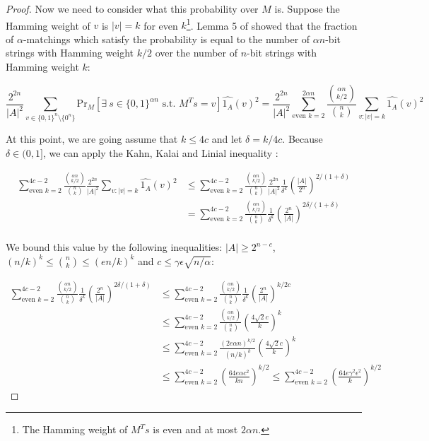 \documentclass[a4paper]{article}
\begin{document}
\begin{proof}
        Now we need to consider what this probability over $M$ is. Suppose the Hamming weight of $v$ is $|v| = k$ for even $k$\footnote{The Hamming weight of $M^Ts$ is even and at most $2\alpha n$.}. Lemma 5 of \cite{Gavinsky:2007:ESO:1250790.1250866} showed that the fraction of $\alpha$-matchings which satisfy the probability is equal to the number of $\alpha n$-bit strings with Hamming weight $k/2$ over the number of $n$-bit strings with Hamming weight $k$:

        $$\frac{2^{2n}}{|A|^2}\sum_{v \in \{0, 1\}^n\setminus\{0^n\}}\mathrm{Pr}_M[\exists~ s \in \{0, 1\}^{\alpha n} \textrm{ s.t. } M^Ts = v]\widehat{1_A}(v)^2 = \frac{2^{2n}}{|A|^2}\sum_{\textrm{even }k=2}^{2\alpha n}\frac{\binom{\alpha n}{k/2}}{\binom{n}{k}}\sum_{v:|v| = k}\widehat{1_A}(v)^2$$

        At this point, we are going assume that $k \leq 4c$ and let $\delta = k/4c$. Because $\delta \in (0,1]$, we can apply the Kahn, Kalai and Linial inequality \cite{21923}:

        \begin{align*}
            \sum_{\textrm{even }k=2}^{4c - 2}\frac{\binom{\alpha n}{k/2}}{\binom{n}{k}}\frac{2^{2n}}{|A|^2}\sum_{v:|v| = k}\widehat{1_A}(v)^2 &\leq \sum_{\textrm{even }k=2}^{4c-2}\frac{\binom{\alpha n}{k/2}}{\binom{n}{k}}\frac{2^{2n}}{|A|^2}\frac{1}{\delta^k}\left(\frac{|A|}{2^n}\right)^{2/(1 + \delta)}\\
            &= \sum_{\textrm{even }k=2}^{4c - 2}\frac{\binom{\alpha n}{k/2}}{\binom{n}{k}}\frac{1}{\delta^k}\left(\frac{2^n}{|A|}\right)^{2\delta/(1 + \delta)}\\
        \end{align*}

        We bound this value by the following inequalities: $|A| \geq 2^{n - c}$, $(n/k)^k \leq \binom{n}{k} \leq (en/k)^k$ and $c \leq \gamma \epsilon \sqrt{n/\alpha}$:

        \begin{align*}
            \sum_{\textrm{even }k=2}^{4c - 2}\frac{\binom{\alpha n}{k/2}}{\binom{n}{k}}\frac{1}{\delta^k}\left(\frac{2^n}{|A|}\right)^{2\delta/(1 + \delta)} &\leq \sum_{\textrm{even }k=2}^{4c - 2}\frac{\binom{\alpha n}{k/2}}{\binom{n}{k}}\frac{1}{\delta^k}\left(\frac{2^n}{|A|}\right)^{k/2c}\\
            &\leq \sum_{\textrm{even }k=2}^{4c - 2}\frac{\binom{\alpha n}{k/2}}{\binom{n}{k}}\left(\frac{4\sqrt{2}c}{k}\right)^{k}\\
            &\leq \sum_{\textrm{even }k=2}^{4c - 2}\frac{(2e\alpha n)^{k/2}}{(n/k)^k}\left(\frac{4\sqrt{2}c}{k}\right)^{k}\\
            &\leq \sum_{\textrm{even }k=2}^{4c - 2}\left(\frac{64e\alpha c^2}{kn}\right)^{k/2} \leq \sum_{\textrm{even }k=2}^{4c - 2}\left(\frac{64e\gamma^2\epsilon^2}{k}\right)^{k/2}
        \end{align*}


\end{proof}
\end{document}
